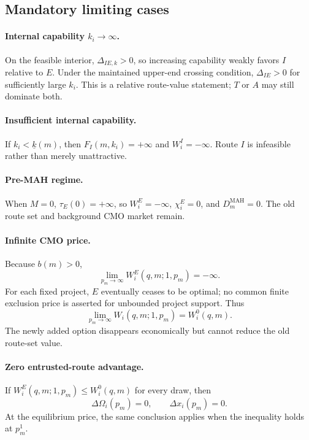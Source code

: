 \subsection{Mandatory limiting cases}
\label{subsec:p15-boundaries}

\paragraph{Internal capability \(k_i\to\infty\).}
On the feasible interior, \(\Delta_{IE,k}>0\), so increasing capability weakly
favors \(I\) relative to \(E\). Under the maintained upper-end crossing
condition, \(\Delta_{IE}>0\) for sufficiently large \(k_i\). This is a relative
route-value statement; \(T\) or \(A\) may still dominate both.

\paragraph{Insufficient internal capability.}
If \(k_i<\underline{k}(m)\), then \(F_I(m,k_i)=+\infty\) and
\(W_i^I=-\infty\). Route \(I\) is infeasible rather than merely unattractive.

\paragraph{Pre-MAH regime.}
When \(M=0\), \(\tau_E(0)=+\infty\), so \(W_i^E=-\infty\),
\(\chi_i^E=0\), and \(D_m^{\mathrm{MAH}}=0\). The old route set and background
CMO market remain.

\paragraph{Infinite CMO price.}
Because \(b(m)>0\),
\[
  \lim_{p_m\to\infty}W_i^E(q,m;1,p_m)=-\infty.
\]
For each fixed project, \(E\) eventually ceases to be optimal; no common
finite exclusion price is asserted for unbounded project support. Thus
\begin{equation}
  \lim_{p_m\to\infty}
  W_i(q,m;1,p_m)
  =
  W_i^0(q,m).
  \label{eq:p15-infinite-price-boundary}
\end{equation}
The newly added option disappears economically but cannot reduce the old
route-set value.

\paragraph{Zero entrusted-route advantage.}
If \(W_i^E(q,m;1,p_m)\leq W_i^0(q,m)\) for every draw, then
\begin{equation}
  \Delta\Omega_i(p_m)=0,
  \qquad
  \Delta x_i(p_m)=0.
  \label{eq:p15-zero-advantage-boundary}
\end{equation}
At the equilibrium price, the same conclusion applies when the inequality
holds at \(p_m^1\).

